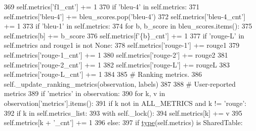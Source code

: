 \begin{DoxyCode}
369                     self.metrics[\textcolor{stringliteral}{'f1\_cnt'}] += 1
370                 \textcolor{keywordflow}{if} \textcolor{stringliteral}{'bleu-4'} \textcolor{keywordflow}{in} self.metrics:
371                     self.metrics[\textcolor{stringliteral}{'bleu-4'}] += bleu\_scores.pop(\textcolor{stringliteral}{'bleu-4'})
372                     self.metrics[\textcolor{stringliteral}{'bleu-4\_cnt'}] += 1
373                 \textcolor{keywordflow}{if} \textcolor{stringliteral}{'bleu-1'} \textcolor{keywordflow}{in} self.metrics:
374                     \textcolor{keywordflow}{for} b, b\_score \textcolor{keywordflow}{in} bleu\_scores.items():
375                         self.metrics[b] += b\_score
376                         self.metrics[f\textcolor{stringliteral}{'\{b\}\_cnt'}] += 1
377                 \textcolor{keywordflow}{if} \textcolor{stringliteral}{'rouge-L'} \textcolor{keywordflow}{in} self.metrics \textcolor{keywordflow}{and} rouge1 \textcolor{keywordflow}{is} \textcolor{keywordflow}{not} \textcolor{keywordtype}{None}:
378                     self.metrics[\textcolor{stringliteral}{'rouge-1'}] += rouge1
379                     self.metrics[\textcolor{stringliteral}{'rouge-1\_cnt'}] += 1
380                     self.metrics[\textcolor{stringliteral}{'rouge-2'}] += rouge2
381                     self.metrics[\textcolor{stringliteral}{'rouge-2\_cnt'}] += 1
382                     self.metrics[\textcolor{stringliteral}{'rouge-L'}] += rougeL
383                     self.metrics[\textcolor{stringliteral}{'rouge-L\_cnt'}] += 1
384 
385         \textcolor{comment}{# Ranking metrics.}
386         self.\_update\_ranking\_metrics(observation, labels)
387 
388         \textcolor{comment}{# User-reported metrics}
389         \textcolor{keywordflow}{if} \textcolor{stringliteral}{'metrics'} \textcolor{keywordflow}{in} observation:
390             \textcolor{keywordflow}{for} k, v \textcolor{keywordflow}{in} observation[\textcolor{stringliteral}{'metrics'}].items():
391                 \textcolor{keywordflow}{if} k \textcolor{keywordflow}{not} \textcolor{keywordflow}{in} ALL\_METRICS \textcolor{keywordflow}{and} k != \textcolor{stringliteral}{'rouge'}:
392                     \textcolor{keywordflow}{if} k \textcolor{keywordflow}{in} self.metrics\_list:
393                         with self.\_lock():
394                             self.metrics[k] += v
395                             self.metrics[k + \textcolor{stringliteral}{'\_cnt'}] += 1
396                     \textcolor{keywordflow}{else}:
397                         \textcolor{keywordflow}{if} \hyperlink{namespaceparlai_1_1agents_1_1tfidf__retriever_1_1build__tfidf_ad5dfae268e23f506da084a9efb72f619}{type}(self.metrics) \textcolor{keywordflow}{is} SharedTable:

\end{DoxyCode}
